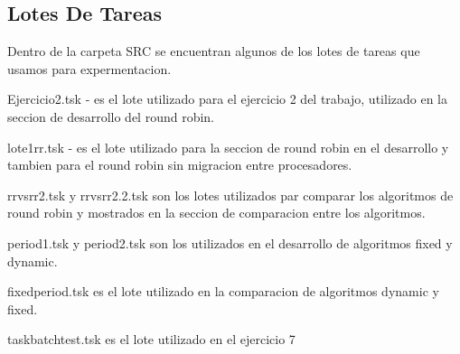 
\subsection{Lotes De Tareas }

Dentro de la carpeta SRC se encuentran algunos de los lotes de tareas que usamos para expermentacion.

Ejercicio2.tsk - es el lote utilizado para el ejercicio 2 del trabajo, utilizado en la seccion de desarrollo del round robin.

lote1rr.tsk - es el lote utilizado para la seccion de round robin en el desarrollo y tambien para el round robin sin migracion entre procesadores.

rrvsrr2.tsk y rrvsrr2.2.tsk son los lotes utilizados par comparar los algoritmos de round robin y mostrados en la seccion de comparacion entre los algoritmos.

period1.tsk y period2.tsk son los utilizados en el desarrollo de algoritmos fixed y dynamic.

fixedperiod.tsk es el lote utilizado en la comparacion de algoritmos dynamic y fixed.

taskbatchtest.tsk es el lote utilizado en el ejercicio 7


